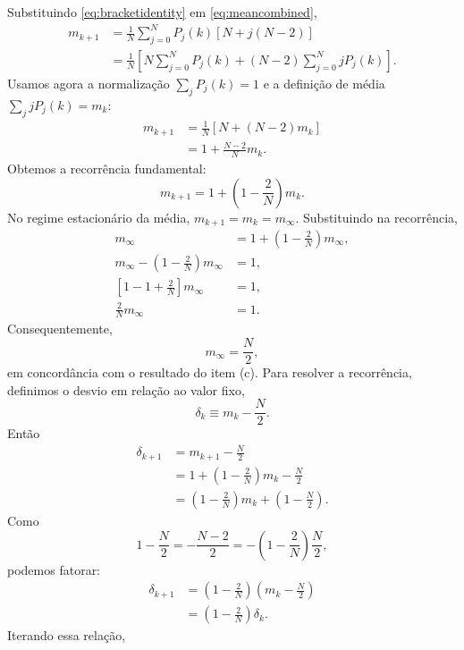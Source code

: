 \documentclass[12pt,a4paper]{article}
\begin{document}
%
Substituindo \eqref{eq:bracketidentity} em \eqref{eq:meancombined},
%
\begin{align}
  m_{k+1}
  &=\frac{1}{N}\sum_{j=0}^{N}P_j(k)\left[N+j(N-2)\right]\nonumber\\
  &=\frac{1}{N}\left[N\sum_{j=0}^{N}P_j(k)+(N-2)\sum_{j=0}^{N}jP_j(k)\right].
\end{align}
%
Usamos agora a normalização $\sum_j P_j(k)=1$ e a definição de média $\sum_j jP_j(k)=m_k$:
%
\begin{align}
  m_{k+1}
  &=\frac{1}{N}\left[N+(N-2)m_k\right]\nonumber\\
  &=1+\frac{N-2}{N}m_k.
\end{align}
%
Obtemos a recorrência fundamental:
%
\begin{equation}
  \boxed{m_{k+1}=1+\left(1-\frac{2}{N}\right)m_k.}
  \label{eq:meanrecurrence}
\end{equation}
%
No regime estacionário da média, $m_{k+1}=m_k=m_\infty$. Substituindo na recorrência,
%
\begin{align}
  m_\infty&=1+\left(1-\frac{2}{N}\right)m_\infty,\\
  m_\infty-\left(1-\frac{2}{N}\right)m_\infty&=1,\\
  \left[1-1+\frac{2}{N}\right]m_\infty&=1,\\
  \frac{2}{N}m_\infty&=1.
\end{align}
%
Consequentemente,
%
\begin{equation}
  {m_\infty=\frac{N}{2},}
\end{equation}
%
em concordância com o resultado do item (c). Para resolver a recorrência, definimos o desvio em relação ao valor fixo,
%
\begin{equation}
  \delta_k\equiv m_k-\frac{N}{2}.
\end{equation}
%
Então
%
\begin{align}
  \delta_{k+1}
  &=m_{k+1}-\frac{N}{2}\nonumber\\
  &=1+\left(1-\frac{2}{N}\right)m_k-\frac{N}{2}\nonumber\\
  &=\left(1-\frac{2}{N}\right)m_k+\left(1-\frac{N}{2}\right).
\end{align}
%
Como
\[
1-\frac{N}{2}=-\frac{N-2}{2}=-\left(1-\frac{2}{N}\right)\frac{N}{2},
\]
podemos fatorar:
%
\begin{align}
  \delta_{k+1}
  &=\left(1-\frac{2}{N}\right)\left(m_k-\frac{N}{2}\right)\nonumber\\
  &=\left(1-\frac{2}{N}\right)\delta_k.
\end{align}
%
Iterando essa relação,
\end{document}
